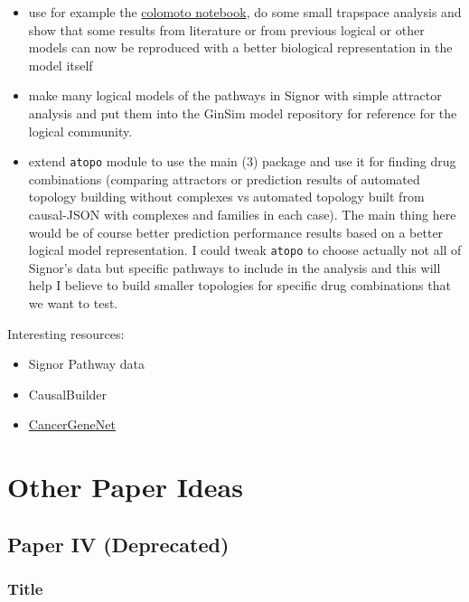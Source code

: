 \documentclass[12pt,]{book}
\providecommand{\tightlist}{%
  \setlength{\itemsep}{0pt}\setlength{\parskip}{0pt}}
\begin{document}
\begin{enumerate}
  \begin{itemize}
  \tightlist
  \item
    use for example the \href{https://github.com/colomoto/colomoto-docker}{colomoto notebook}, do some small trapspace analysis and show that some results from literature or from previous logical or other models can now be reproduced with a better biological representation in the model itself
  \item
    make many logical models of the pathways in Signor with simple attractor analysis and put them into the GinSim model repository for reference for the logical community.
  \item
    extend \texttt{atopo} module to use the main (3) package and use it for finding drug combinations (comparing attractors or prediction results of automated topology building without complexes vs automated topology built from causal-JSON with complexes and families in each case).
    The main thing here would be of course better prediction performance results based on a better logical model representation.
    I could tweak \texttt{atopo} to choose actually not all of Signor's data but specific pathways to include in the analysis and this will help I believe to build smaller topologies for specific drug combinations that we want to test.
  \end{itemize}
\end{enumerate}

Interesting resources:

\begin{itemize}
\tightlist
\item
  Signor Pathway data
\item
  CausalBuilder
\item
  \href{https://doi.org/10.1093/nar/gkz871}{CancerGeneNet}
\end{itemize}

\hypertarget{other-paper-ideas}{%
\section{Other Paper Ideas}\label{other-paper-ideas}}

\hypertarget{paper-iv-deprecated}{%
\subsection*{Paper IV (Deprecated)}\label{paper-iv-deprecated}}

\hypertarget{title}{%
\subsubsection*{Title}\label{title}}
\end{document}

